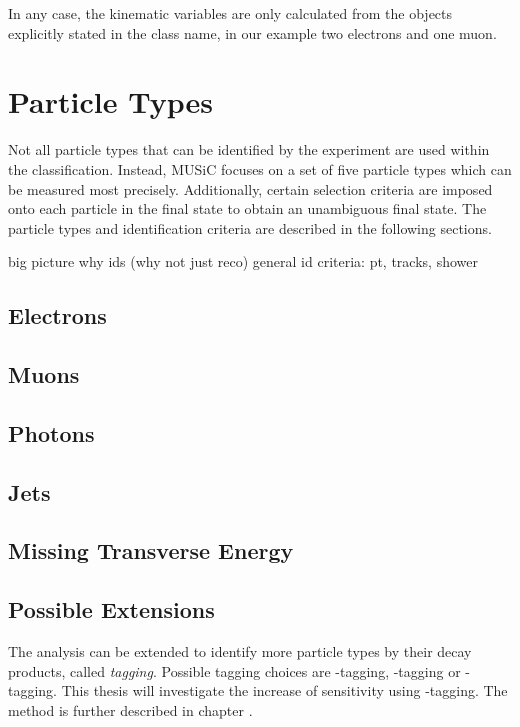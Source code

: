 In any case, the kinematic variables are only calculated from the objects explicitly stated in the class name, in our example two electrons and one muon.


\section{Particle Types}
Not all particle types that can be identified by the experiment are used within the classification. Instead, \ac{MUSiC} focuses on a set of five particle types which can be measured most precisely.
Additionally, certain selection criteria are imposed onto each particle in the final state to obtain an unambiguous final state.
The particle types and identification criteria are described in the following sections.

big picture
why ids (why not just reco)
general id criteria: pt, tracks, shower


\subsection{Electrons}



\subsection{Muons}

\subsection{Photons}

\subsection{Jets}

\subsection{Missing Transverse Energy}

\subsection{Possible Extensions}
The analysis can be extended to identify more particle types by their decay products, called \emph{tagging}. Possible tagging choices are \Pqb-tagging, \Ptau-tagging or \PZ-tagging.
This thesis will investigate the increase of sensitivity using \Pqb-tagging. The method is further described in chapter .

